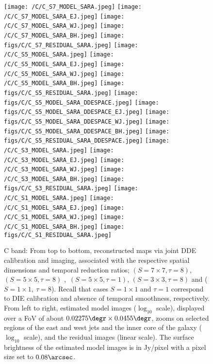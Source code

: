 \begin{landscape}
\begin{figure}
\centering
\texttt{[image: /C/C\_S7\_MODEL\_SARA.jpeg]}
\texttt{[image: /C/C\_S7\_MODEL\_SARA\_EJ.jpeg]}
\texttt{[image: /C/C\_S7\_MODEL\_SARA\_WJ.jpeg]}
\texttt{[image: /C/C\_S7\_MODEL\_SARA\_BH.jpeg]}
\texttt{[image: figs/C/C\_S7\_RESIDUAL\_SARA.jpeg]}
%
\texttt{[image: /C/C\_S5\_MODEL\_SARA.jpeg]}
\texttt{[image: /C/C\_S5\_MODEL\_SARA\_EJ.jpeg]}
\texttt{[image: /C/C\_S5\_MODEL\_SARA\_WJ.jpeg]}
\texttt{[image: /C/C\_S5\_MODEL\_SARA\_BH.jpeg]}
\texttt{[image: figs/C/C\_S5\_RESIDUAL\_SARA.jpeg]}
%
\texttt{[image: figs/C/C\_S5\_MODEL\_SARA\_DDESPACE.jpeg]}
\texttt{[image: figs/C/C\_S5\_MODEL\_SARA\_DDESPACE\_EJ.jpeg]}
\texttt{[image: figs/C/C\_S5\_MODEL\_SARA\_DDESPACE\_WJ.jpeg]}
\texttt{[image: figs/C/C\_S5\_MODEL\_SARA\_DDESPACE\_BH.jpeg]}
\texttt{[image: figs/C/C\_S5\_RESIDUAL\_SARA\_DDESPACE.jpeg]}
%
\texttt{[image: /C/C\_S3\_MODEL\_SARA.jpeg]}
\texttt{[image: /C/C\_S3\_MODEL\_SARA\_EJ.jpeg]}
\texttt{[image: /C/C\_S3\_MODEL\_SARA\_WJ.jpeg]}
\texttt{[image: /C/C\_S3\_MODEL\_SARA\_BH.jpeg]}
\texttt{[image: figs/C/C\_S3\_RESIDUAL\_SARA.jpeg]}
%
\texttt{[image: /C/C\_S1\_MODEL\_SARA.jpeg]}
\texttt{[image: /C/C\_S1\_MODEL\_SARA\_EJ.jpeg]}
\texttt{[image: /C/C\_S1\_MODEL\_SARA\_WJ.jpeg]}
\texttt{[image: /C/C\_S1\_MODEL\_SARA\_BH.jpeg]}
\texttt{[image: figs/C/C\_S1\_RESIDUAL\_SARA.jpeg]}
%

\caption{C band: From top to bottom, reconstructed maps via joint DDE calibration and imaging, associated with the respective spatial dimensions and temporal reduction ratios; $(S=7\times 7,\tau=8)$, $(S=5\times 5,\tau =8)$ ,~$(S= 5\times 5,\tau =1)$, $(S=3\times 3,\tau =8)$ and ($S=1\times1,~\tau =8$). Recall that  cases $S=1\times1$ and $\tau =1$ correspond to DIE calibration and absence of temporal smoothness, respectively. From left to right, estimated model images ($\log_{10}$ scale), {{displayed over a FoV of about $0.02275\degr \times 0.0455\degr$}}, zooms on selected regions of the east and west jets and the inner core of the galaxy ($\log_{10}$ scale), and the residual images (linear scale). The surface brightness of the estimated model images is in Jy/pixel with a pixel size set to $0.08\arcsec$.}
\label{fig:c_maps}

\end{figure}
\end{landscape}
